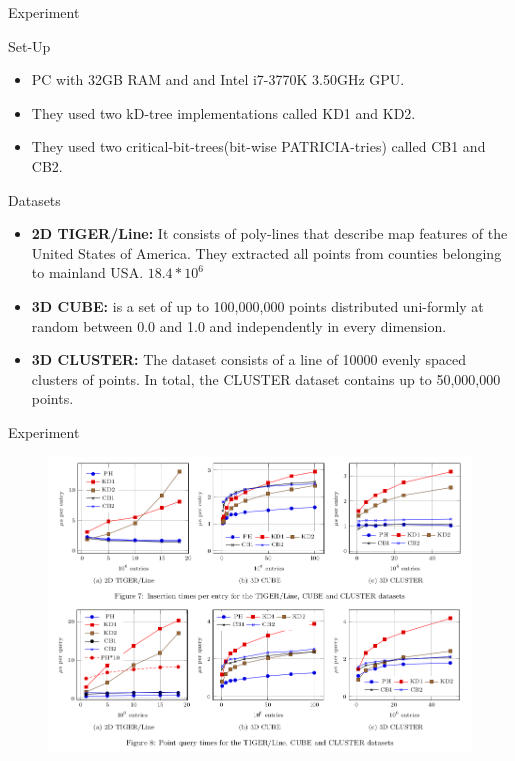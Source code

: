 \documentclass{beamer}
\begin{document}
\begin{frame}{Experiment}
 \begin{block}{Set-Up}
  \begin{itemize}
   \item PC with 32GB RAM and and Intel i7-3770K 3.50GHz GPU.
   \item They used two kD-tree implementations called KD1 and KD2.
   \item They used two critical-bit-trees(bit-wise PATRICIA-tries) called CB1 and CB2.
  \end{itemize}
 \end{block}
 \begin{block}{Datasets}
  \begin{itemize}
   \item \textbf{2D TIGER/Line:} It consists of poly-lines that describe map features of the United States of America. They extracted all points from counties belonging to mainland USA. $18.4 * 10^6$
   \item \textbf{3D CUBE:} is a set of up to 100,000,000 points distributed uni-formly at random between 0.0 and 1.0 and independently in every dimension.
   \item \textbf{3D CLUSTER:} The dataset consists of a line of 10000 evenly spaced clusters of points. In total, the CLUSTER dataset contains up to 50,000,000 points.
  \end{itemize}
 \end{block}
\end{frame}

\begin{frame}{Experiment}
 \begin{figure}
  \centering
  \includegraphics[scale = 0.3]{12.png}
 \end{figure}
\end{frame}
\end{document}
